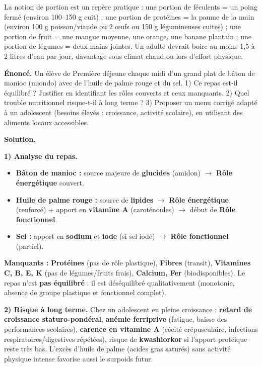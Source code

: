 \documentclass[11pt]{article}
\newcommand{\cle}[1]{{\popxbold\color{popdark}#1}}
\begin{document}
La notion de \cle{portion} est un repère pratique : une portion de féculents = un poing fermé (environ 100--150 g cuit) ; une portion de protéines = la paume de la main (environ 100 g poisson/viande ou 2 œufs ou 150 g légumineuses cuites) ; une portion de fruit = une mangue moyenne, une orange, une banane plantain ; une portion de légumes = deux mains jointes. Un adulte devrait boire au moins 1,5 à 2 litres d'eau par jour, davantage sous climat chaud ou lors d'effort physique.

\begin{exoresolu}
\textbf{Énoncé.} Un élève de Première déjeune chaque midi d'un grand plat de bâton de manioc (miondo) avec de l'huile de palme rouge et du sel. 1) Ce repas est-il équilibré ? Justifier en identifiant les rôles couverts et ceux manquants. 2) Quel trouble nutritionnel risque-t-il à long terme ? 3) Proposer un menu corrigé adapté à un adolescent (besoins élevés : croissance, activité scolaire), en utilisant des aliments locaux accessibles.

\tcblower

\textbf{Solution.}

\textbf{1) Analyse du repas.}
\begin{itemize}
  \item \textbf{Bâton de manioc :} source majeure de \textbf{glucides} (amidon) $\rightarrow$ \textbf{Rôle énergétique} couvert.
  \item \textbf{Huile de palme rouge :} source de \textbf{lipides} $\rightarrow$ \textbf{Rôle énergétique} (renforcé) + apport en \textbf{vitamine A} (caroténoïdes) $\rightarrow$ début de \textbf{Rôle fonctionnel}.
  \item \textbf{Sel :} apport en \textbf{sodium} et \textbf{iode} (si sel iodé) $\rightarrow$ \textbf{Rôle fonctionnel} (partiel).
\end{itemize}
\textbf{Manquants :} \textbf{Protéines} (pas de rôle plastique), \textbf{Fibres} (transit), \textbf{Vitamines C, B, E, K} (pas de légumes/fruits frais), \textbf{Calcium, Fer} (biodisponibles). Le repas n'est \textbf{pas équilibré} : il est déséquilibré qualitativement (monotonie, absence de groupe plastique et fonctionnel complet).

\textbf{2) Risque à long terme.}
Chez un adolescent en pleine croissance : \textbf{retard de croissance staturo-pondéral}, \textbf{anémie ferriprive} (fatigue, baisse des performances scolaires), \textbf{carence en vitamine A} (cécité crépusculaire, infections respiratoires/digestives répétées), risque de \textbf{kwashiorkor} si l'apport protéique reste très bas. L'excès d'huile de palme (acides gras saturés) sans activité physique intense favorise aussi le surpoids futur.


\end{exoresolu}
\end{document}

